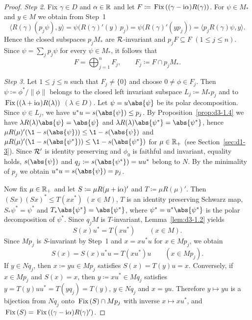 \begin{proof}
\emph{Step 2.}
Fix $\gamma \in D$ and $\alpha \in \mathbb{R}$ and let $F \coloneq \mathop{}\mathrm{Fix}\left((\gamma - \mathrm{i}\alpha)R(\gamma)\right)$.
For $\psi \in M_{*}$ and $y \in M$ we obtain from Step~1
\[
	\langle R(\gamma)(p_{j}\psi), y \rangle 
	= \psi\bigl(R(\gamma)'(y)\,p_{j}\bigr) 
	= \psi\bigl(R(\gamma)'(yp_{j})\bigr) 
	= \langle p_{j}R(\gamma)\psi, y \rangle .
\]
Hence the closed subspaces $p_{j}M_{*}$ are $\mathcal{R}$-invariant and $p_{j}F \subseteq F$ $(1 \leq j \leq n)$.
Since $\psi = \sum_{j} p_{j}\psi$ for every $\psi \in M_{*}$, it follows that
\[
	F = \bigoplus_{j=1}^{n} F_{j}, \qquad F_{j} \coloneq F \cap p_{j}M_{*} .
\]

\emph{Step 3.}
Let $1 \leq j \leq n$ such that $F_{j} \neq \{0\}$ and choose $0 \neq \phi \in F_{j}$.
Then $\psi \coloneq \phi^{*}/\|\phi\|$ belongs to the closed left invariant subspace $L_{j} \coloneq M_{*}p_{j}$ and to $\mathop{}\mathrm{Fix}\left((\lambda + \mathrm{i}\alpha)R(\lambda)\right)$ $(\lambda \in D)$.
Let $\psi = u\abs{\psi}$ be its polar decomposition.
Since $\psi \in L_{j}$, we have $u^{*}u = s(\abs{\psi}) \leq p_{j}$.
By Proposition~\ref{prop:d3-1.4} we have $\lambda R(\lambda)\abs{\psi} = \abs{\psi}$ and $\lambda R(\lambda)\abs{\psi^{*}} = \abs{\psi^{*}}$, hence $\mu R(\mu)'(\1 - s(\abs{\psi})) \leq \1 - s(\abs{\psi})$ and $\mu R(\mu)'(\1 - s(\abs{\psi^{*}})) \leq \1 - s(\abs{\psi^{*}})$ for $\mu \in \mathbb{R}_{+}$ (see Section~\ref{sec:d1-3}).
Since $\mathcal{R}'$ is identity preserving and $\phi_{0}$ is faithful and invariant, equality holds, \ie $s(\abs{\psi})$ and $q_{j} \coloneq s(\abs{\psi^{*}}) = uu^{*}$ belong to $N$.
By the minimality of\/ $p_{j}$ we obtain $u^{*}u = s(\abs{\psi}) = p_{j}$.

Now fix $\mu \in \mathbb{R}_{+}$ and let $S \coloneq \mu R(\mu + \mathrm{i}\alpha)'$ and $T \coloneq \mu R(\mu)'$.
Then $(Sx)(Sx)^{*} \leq T(xx^{*})$ $(x \in M)$, $T$ is an identity preserving Schwarz map, $S_{*}\psi^{*} = \psi^{*}$ and $T_{*}\abs{\psi^{*}} = \abs{\psi^{*}}$, where $\psi^{*} = u^{*}\abs{\psi^{*}}$ is the polar decomposition of\/ $\psi^{*}$.
Since $q_{j}M$ is $T$-invariant, Lemma~\ref{lem:d3-1.2} yields
\[
	S(x)u^{*} = T(xu^{*}) \qquad (x \in M) .
\]
Since $Mp_{j}$ is $S$-invariant by Step~1 and $x = xu^{*}u$ for $x \in Mp_{j}$, we obtain
\[
	S(x) = S(x)u^{*}u = T(xu^{*})u \qquad (x \in Mp_{j}) .
\]
If\/ $y \in Nq_{j}$, then $x \coloneq yu \in Mp_{j}$ satisfies $S(x) = T(y)u = x$.
Conversely, if\/ $x \in Mp_{j}$ and $S(x) = x$, then $y \coloneq xu^{*} \in Mq_{j}$ satisfies $y = T(y)uu^{*} = T(yq_{j}) = T(y)$, \ie $y \in Nq_{j}$ and $x = yu$.
Therefore $y \mapsto yu$ is a bijection from $Nq_{j}$ onto $\mathop{}\mathrm{Fix}\left(S\right) \cap Mp_{j}$ with inverse $x \mapsto xu^{*}$, and $\mathop{}\mathrm{Fix}\left(S\right) = \mathop{}\mathrm{Fix}\left((\gamma - \mathrm{i}\alpha)R(\gamma)'\right)$.


\end{proof}
